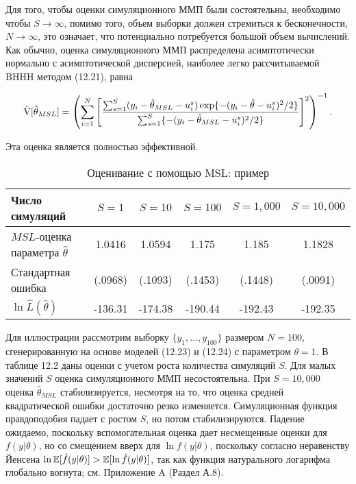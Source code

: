 Для того, чтобы оценки симуляционного ММП были состоятельны, необходимо чтобы $S \rightarrow \infty$, помимо того, объем выборки должен стремиться к бесконечности, $N \rightarrow \infty$, это означает, что потенциально потребуется большой объем вычислений. Как обычно, оценка симуляционного ММП распределена асимптотически нормально с асимптотической дисперсией, наиболее легко рассчитываемой BHHH методом (12.21), равна 

\begin{equation}
\hat{\mathrm{V}}[\hat{\theta}_{MSL}]=\left(\sum^{N}_{i=1}\left[\dfrac{\sum^{S}_{s=1}(y_i-\hat{\theta}_{MSL}-u^{s}_i)\exp\lbrace{-(y_i-\hat{\theta}-u^{s}_i)^{2}/2} \rbrace} {\sum^{S}_{s=1}\lbrace{-(y_i-\hat{\theta}_{MSL}-u^{s}_i)^{2}/2} \rbrace} \right]^{2}  \right)^{-1}.
\end{equation}

Эта оценка является полностью эффективной.

\begin{table}[h]
\begin{center}
\caption{\label{tab:pred} Оценивание с помощью MSL: пример}
\begin{tabular}{lccccc}
\hline 
\hline
{\bf{Число симуляций}} & $S = 1$ & $S = 10$ & $S = 100$ & $S = 1,000$ & $S = 10,000$ \\ 
\hline
$MSL$-оценка параметра $\hat{\theta}$ & 1.0416 & 1.0594 & 1.175 & 1.185 & 1.1828 \\ 
Стандартная ошибка & (.0968) & (.1093) & (.1453) & (.1448) & (.0091) \\ 
$\ln\hat{L}(\hat{\theta})$ & -136.31 & -174.38 & -190.44 & -192.43 & -192.35 \\ 
\hline 
\hline
\end{tabular} 
\end{center}
\end{table}

Для иллюстрации рассмотрим выборку $\lbrace{y_1,\ldots ,y_{100}}\rbrace$ размером $N=100$, сгенерированную на основе моделей (12.23) и (12.24) с параметром $\theta=1$. В таблице 12.2 даны оценки с учетом роста количества симуляций $S$. Для малых значений $S$  оценка симуляционного ММП несостоятельна. При $S=10,000$  оценка $\hat{\theta}_{MSL}$ стабилизируется, несмотря на то, что оценка средней квадратической ошибки достаточно резко изменяется. Симуляционная функция правдоподобия падает с ростом $S$, но потом стабилизируются.     Падение ожидаемо, поскольку вспомогательная оценка дает несмещенные оценки для $f(y|\theta)$, но со смещением вверх для $\ln{f(y|\theta)}$, поскольку согласно неравенству Йенсена $\ln{\mathbb{E}[\hat{f}(y|\theta)]}>\mathbb{E}[\ln{\hat{f}(y|\theta)}]$, так как функция натурального логарифма глобально вогнута; см. Приложение A (Раздел А.8).

